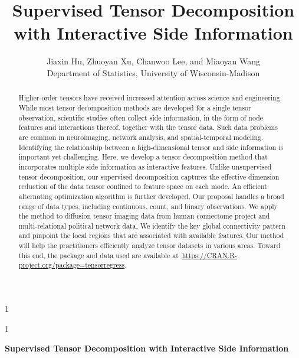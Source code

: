 \documentclass[12pt]{article}
\newcommand{\blind}{1}
\theoremstyle{definition}
\theoremstyle{definition}
\begin{document}
\def\spacingset#1{\renewcommand{\baselinestretch}%
{#1}\small\normalsize} \spacingset{1}



\blind
{
  \title{\bf Supervised Tensor Decomposition with Interactive Side Information}
  \author{Jiaxin Hu, Zhuoyan Xu, Chanwoo Lee, and Miaoyan Wang\\
    Department of Statistics, University of Wisconsin-Madison}
  \maketitle
} \fi

\blind
{
  \bigskip
  \bigskip
  \bigskip
  \begin{center}
    {\LARGE\bf Supervised Tensor Decomposition with Interactive Side Information}
\end{center}
  \medskip
} \fi

\bigskip
\begin{abstract}
Higher-order tensors have received increased attention across science and engineering. While most tensor decomposition methods are developed for a single tensor observation, scientific studies often collect side information, in the form of node features and interactions thereof, together with the tensor data. Such data problems are common in neuroimaging, network analysis, and spatial-temporal modeling. Identifying the relationship between a high-dimensional tensor and side information is important yet challenging. Here, we develop a tensor decomposition method that incorporates multiple side information as interactive features. Unlike unsupervised tensor decomposition, our supervised decomposition captures the effective dimension reduction of the data tensor confined to feature space on each mode. An efficient alternating optimization algorithm is further developed. Our proposal handles a broad range of data types, including continuous, count, and binary observations. We apply the method to diffusion tensor imaging data from human connectome project and multi-relational political network data. We identify the key global connectivity pattern and pinpoint the local regions that are associated with available features. Our method will help the practitioners efficiently analyze tensor datasets in various areas. Toward this end, the package and data used are available at~\url{https://CRAN.R-project.org/package=tensorregress}.

\end{abstract}
\end{document}
